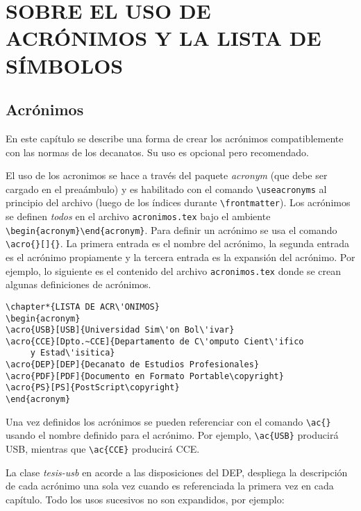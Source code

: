 \chapter{SOBRE EL USO DE ACR\'ONIMOS Y LA LISTA DE S\'IMBOLOS}
\section{Acr\'onimos}
En este cap\'itulo se describe una forma de crear los acr\'onimos compatiblemente con las normas de los decanatos. Su uso es opcional pero recomendado.  

El uso de los acronimos se hace a trav\'es del paquete {\sl acronym} (que debe ser cargado en el prea\'ambulo) y es habilitado
con el comando \verb+\useacronyms+ al principio del archivo (luego de los \'indices durante \verb+\frontmatter+). Los
acr\'onimos se definen {\em todos} en el archivo {\tt acronimos.tex} bajo el ambiente \verb+\begin{acronym}+\verb+\end{acronym}+. Para definir un acr\'onimo se usa el comando \verb+\acro{}[]{}+. La primera entrada es el nombre del acr\'onimo, la segunda entrada es el acr\'onimo propiamente y la tercera entrada es la expansi\'on del acr\'onimo. Por ejemplo, lo siguiente es el contenido del archivo \texttt{acronimos.tex} donde se crean algunas definiciones de acr\'onimos.
\begin{verbatim}
\chapter*{LISTA DE ACR\'ONIMOS}
\begin{acronym}
\acro{USB}[USB]{Universidad Sim\'on Bol\'ivar}
\acro{CCE}[Dpto.~CCE]{Departamento de C\'omputo Cient\'ifico 
     y Estad\'isitica}
\acro{DEP}[DEP]{Decanato de Estudios Profesionales}
\acro{PDF}[PDF]{Documento en Formato Portable\copyright}
\acro{PS}[PS]{PostScript\copyright}
\end{acronym}
\end{verbatim}
Una vez definidos los acr\'onimos se pueden referenciar con el comando \verb+\ac{}+ usando el nombre definido para el acr\'onimo. Por
ejemplo, \verb+\ac{USB}+ producir\'a \ac{USB}, mientras que \verb+\ac{CCE}+ producir\'a \ac{CCE}.

La clase {\sl tesis-usb} en acorde a las disposiciones del \ac{DEP}, despliega la descripci\'on
de cada acr\'onimo una sola vez cuando es referenciada la primera vez en cada cap\'itulo. Todo
los usos sucesivos no son expandidos, por ejemplo:


